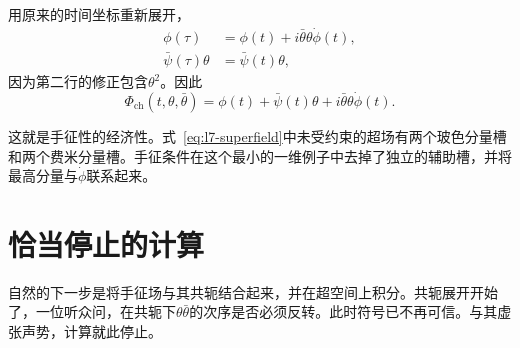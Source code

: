 \begin{classroomqa}
\end{classroomqa}

用原来的时间坐标重新展开，
\begin{align}
\phi(\tau)
&=\phi(t)+i\bar\theta\theta\dot\phi(t),\\
\bar\psi(\tau)\theta
&=\bar\psi(t)\theta,
\end{align}
因为第二行的修正包含\(\theta^2\)。因此
\begin{equation}
\Phi_{\mathrm{ch}}(t,\theta,\bar\theta)
=\phi(t)+\bar\psi(t)\theta
+i\bar\theta\theta\dot\phi(t).
\label{eq:l7-chiral-field-components}
\end{equation}

\begin{classroomqa}
\end{classroomqa}

这就是手征性的经济性。式~\eqref{eq:l7-superfield}中未受约束的超场有两个玻色分量槽和两个费米分量槽。手征条件在这个最小的一维例子中去掉了独立的辅助槽，并将最高分量与\(\dot\phi\)联系起来。

\section{恰当停止的计算}

自然的下一步是将手征场与其共轭结合起来，并在超空间上积分。共轭展开开始了，一位听众问，在共轭下\(\theta\bar\theta\)的次序是否必须反转。此时符号已不再可信。与其虚张声势，计算就此停止。

\begin{classroomqa}
\end{classroomqa}

